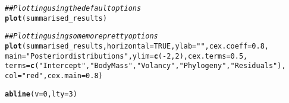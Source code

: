 \documentclass{article}\usepackage[]{graphicx}\usepackage[]{color}
\makeatletter
\newcommand{\hlnum}[1]{\textcolor[rgb]{0.686,0.059,0.569}{#1}}%
\newcommand{\hlstr}[1]{\textcolor[rgb]{0.192,0.494,0.8}{#1}}%
\newcommand{\hlcom}[1]{\textcolor[rgb]{0.678,0.584,0.686}{\textit{#1}}}%
\newcommand{\hlopt}[1]{\textcolor[rgb]{0,0,0}{#1}}%
\newcommand{\hlstd}[1]{\textcolor[rgb]{0.345,0.345,0.345}{#1}}%
\newcommand{\hlkwc}[1]{\textcolor[rgb]{0.333,0.667,0.333}{#1}}%
\newcommand{\hlkwd}[1]{\textcolor[rgb]{0.737,0.353,0.396}{\textbf{#1}}}%
\newenvironment{kframe}{%
 \def\at@end@of@kframe{}%
 \ifinner\ifhmode%
  \def\at@end@of@kframe{\end{minipage}}%
  \begin{minipage}{\columnwidth}%
 \fi\fi%
 \def\FrameCommand##1{\hskip\@totalleftmargin \hskip-\fboxsep
 \colorbox{shadecolor}{##1}\hskip-\fboxsep
     \hskip-\linewidth \hskip-\@totalleftmargin \hskip\columnwidth}%
 \MakeFramed {\advance\hsize-\width
   \@totalleftmargin\z@ \linewidth\hsize
   \@setminipage}}%
 {\par\unskip\endMakeFramed%
 \at@end@of@kframe}
\newenvironment{knitrout}{}{} %
\makeatother
\begin{document}
\begin{knitrout}
\color{fgcolor}\begin{kframe}
\begin{alltt}
\hlcom{## Plotting using the default options}
\hlkwd{plot}\hlstd{(summarised_results)}
\end{alltt}


{\ttfamily\noindent\bfseries\color{errorcolor}{\#\# Error in plot(summarised\_results): object 'summarised\_results' not found}}\end{kframe}
\end{knitrout}

\begin{knitrout}
\color{fgcolor}\begin{kframe}
\begin{alltt}
\hlcom{## Plotting using some more pretty options}
\hlkwd{plot}\hlstd{(summarised_results,} \hlkwc{horizontal} \hlstd{=} \hlnum{TRUE}\hlstd{,} \hlkwc{ylab} \hlstd{=} \hlstr{""}\hlstd{,} \hlkwc{cex.coeff} \hlstd{=} \hlnum{0.8}\hlstd{,}
    \hlkwc{main} \hlstd{=} \hlstr{"Posterior distributions"}\hlstd{,} \hlkwc{ylim} \hlstd{=} \hlkwd{c}\hlstd{(}\hlopt{-}\hlnum{2}\hlstd{,}\hlnum{2}\hlstd{),} \hlkwc{cex.terms} \hlstd{=} \hlnum{0.5}\hlstd{,}
    \hlkwc{terms} \hlstd{=} \hlkwd{c}\hlstd{(}\hlstr{"Intercept"}\hlstd{,} \hlstr{"Body Mass"}\hlstd{,} \hlstr{"Volancy"}\hlstd{,} \hlstr{"Phylogeny"}\hlstd{,} \hlstr{"Residuals"}\hlstd{),}
    \hlkwc{col} \hlstd{=} \hlstr{"red"}\hlstd{,} \hlkwc{cex.main} \hlstd{=} \hlnum{0.8}\hlstd{)}
\end{alltt}


{\ttfamily\noindent\bfseries{}}\begin{alltt}
\hlkwd{abline}\hlstd{(}\hlkwc{v} \hlstd{=} \hlnum{0}\hlstd{,} \hlkwc{lty} \hlstd{=} \hlnum{3}\hlstd{)}
\end{alltt}


{\ttfamily\noindent\bfseries\color{errorcolor}{\#\# Error in int\_abline(a = a, b = b, h = h, v = v, untf = untf, ...): plot.new has not been called yet}}\end{kframe}
\end{knitrout}
\end{document}
